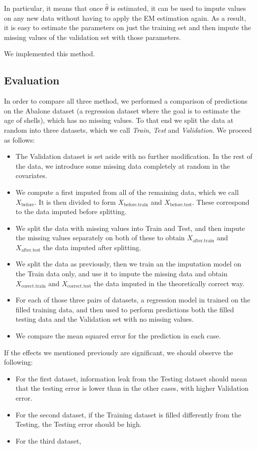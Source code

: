 \documentclass[12pt, a4paper]{article}
\begin{document}
In particular, it means that once $\hat{\theta}$ is estimated, it can be used to impute values on any new data without having to apply the EM estimation again. As a result, it is easy to estimate the parameters on just the training set and then impute the missing values of the validation set with those parameters.

We implemented this method.
\subsection{Evaluation}
In order to compare all three method, we performed a comparison of predictions on the Abalone dataset (a regression dataset where the goal is to estimate the age of shells), which has no missing values. To that end we split the data at random into three datasets, which we call \emph{Train}, \emph{Test} and \emph{Validation}. We proceed as follows:
\begin{itemize}
\item The Validation dataset is set aside with no further modification. In the rest of the data, we introduce some missing data completely at random in the covariates.
\item We compute a first imputed from all of the remaining data, which we call $X_\text{before}$. It is then divided to form $X_\text{before.train}$ and $X_\text{before.test}$. These correspond to the data imputed before splitting.
\item We split the data with missing values into Train and Test, and then impute the missing values separately on both of these to obtain $X_\text{after.train}$ and $X_\text{after.test}$ the data imputed after splitting.
\item We split the data as previously, then we train an the imputation model on the Train data only, and use it to impute the missing data and obtain $X_\text{corect.train}$ and $X_\text{correct.test}$ the data imputed in the theoretically correct way.
\item For each of those three pairs of datasets, a regression model in trained on the filled training data, and then used to perform predictions both the filled testing data and the Validation set with no missing values.
\item We compare the mean squared error for the prediction in each case.
\end{itemize}

If the effects we mentioned previously are significant, we should observe the following:
\begin{itemize}
\item For the first dataset, information leak from the Testing dataset should mean that the testing error is lower than in the other cases, with higher Validation error.
\item For the second dataset, if the Training dataset is filled differently from the Testing, the Testing error should be high.
\item For the third dataset, 
\end{itemize}
\end{document}
